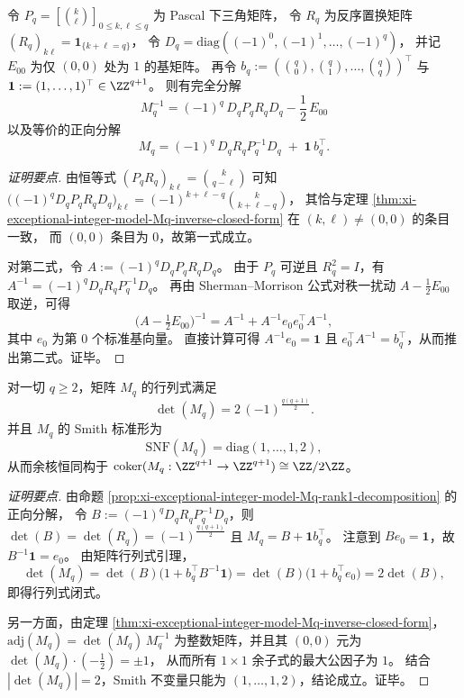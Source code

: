 \begin{proposition}\label{prop:xi-exceptional-integer-model-Mq-rank1-decomposition}
令 \(P_q=[\binom{k}{\ell}]_{0\le k,\ell\le q}\) 为 Pascal 下三角矩阵，
令 \(R_q\) 为反序置换矩阵 \((R_q)_{k\ell}=\mathbf 1_{\{k+\ell=q\}}\)，
令 \(D_q=\mathrm{diag}(({-1})^{0},({-1})^{1},\dots,({-1})^{q})\)，
并记 \(E_{00}\) 为仅 \((0,0)\) 处为 \(1\) 的基矩阵。
再令 \(b_q:=(\binom{q}{0},\binom{q}{1},\dots,\binom{q}{q})^{\top}\) 与 \(\mathbf 1:=(1,\dots,1)^{\top}\in\ZZ^{q+1}\)。
则有完全分解
\[
\boxed{\;
M_q^{-1}=(-1)^q\,D_qP_qR_qD_q-\frac12\,E_{00}\;}
\]
以及等价的正向分解
\[
\boxed{\;
M_q=(-1)^q\,D_qR_qP_q^{-1}D_q\;+\;\mathbf 1\,b_q^{\top}.\;}
\]
\end{proposition}
\begin{proof}[证明要点]
由恒等式 \((P_qR_q)_{k\ell}=\binom{k}{q-\ell}\) 可知
\(\bigl(({-1})^qD_qP_qR_qD_q\bigr)_{k\ell}=(-1)^{k+\ell-q}\binom{k}{k+\ell-q}\)，
其恰与定理 \ref{thm:xi-exceptional-integer-model-Mq-inverse-closed-form} 在 \((k,\ell)\neq(0,0)\) 的条目一致，
而 \((0,0)\) 条目为 \(0\)，故第一式成立。
\par
对第二式，令 \(A:=(-1)^qD_qP_qR_qD_q\)。
由于 \(P_q\) 可逆且 \(R_q^2=I\)，有
\(
A^{-1}=(-1)^qD_qR_qP_q^{-1}D_q
\)。
再由 Sherman--Morrison 公式对秩一扰动 \(A-\frac12E_{00}\) 取逆，可得
\[
\bigl(A-\tfrac12E_{00}\bigr)^{-1}=A^{-1}+A^{-1}e_0e_0^{\top}A^{-1},
\]
其中 \(e_0\) 为第 \(0\) 个标准基向量。
直接计算可得 \(A^{-1}e_0=\mathbf 1\) 且 \(e_0^{\top}A^{-1}=b_q^{\top}\)，从而推出第二式。证毕。
\end{proof}

\begin{theorem}\label{thm:xi-exceptional-integer-model-Mq-det-snf}
对一切 \(q\ge 2\)，矩阵 \(M_q\) 的行列式满足
\[
\boxed{\;\det(M_q)=2\,(-1)^{\frac{q(q+1)}{2}}.\;}
\]
并且 \(M_q\) 的 Smith 标准形为
\[
\boxed{\;\mathrm{SNF}(M_q)=\mathrm{diag}(1,\dots,1,2),\;}
\]
从而余核恒同构于 \(\mathrm{coker}(M_q:\ZZ^{q+1}\to\ZZ^{q+1})\cong\ZZ/2\ZZ\)。
\end{theorem}
\begin{proof}[证明要点]
由命题 \ref{prop:xi-exceptional-integer-model-Mq-rank1-decomposition} 的正向分解，
令 \(B:=(-1)^qD_qR_qP_q^{-1}D_q\)，则 \(\det(B)=\det(R_q)=(-1)^{\frac{q(q+1)}{2}}\) 且 \(M_q=B+\mathbf 1 b_q^{\top}\)。
注意到 \(Be_0=\mathbf 1\)，故 \(B^{-1}\mathbf 1=e_0\)。
由矩阵行列式引理，
\[
\det(M_q)=\det(B)\bigl(1+b_q^{\top}B^{-1}\mathbf 1\bigr)
=\det(B)\bigl(1+b_q^{\top}e_0\bigr)
=2\det(B),
\]
即得行列式闭式。
\par
另一方面，由定理 \ref{thm:xi-exceptional-integer-model-Mq-inverse-closed-form}，
\(\mathrm{adj}(M_q)=\det(M_q)\,M_q^{-1}\) 为整数矩阵，并且其 \((0,0)\) 元为
\(\det(M_q)\cdot(-\tfrac12)=\pm1\)，
从而所有 \(1\times 1\) 余子式的最大公因子为 \(1\)。
结合 \(|\det(M_q)|=2\)，Smith 不变量只能为 \((1,\dots,1,2)\)，结论成立。证毕。
\end{proof}

